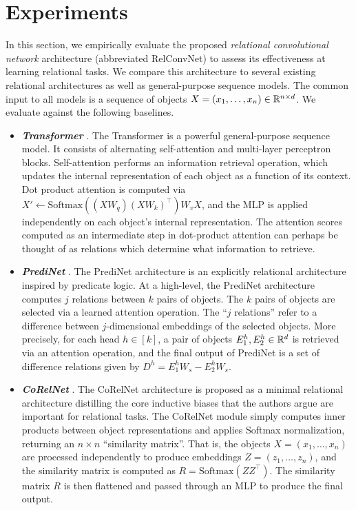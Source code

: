 \section{Experiments}\label{sec:experiments}

In this section, we empirically evaluate the proposed \textit{relational convolutional network} architecture (abbreviated RelConvNet) to assess its effectiveness at learning relational tasks. We compare this architecture to several existing relational architectures as well as general-purpose sequence models. The common input to all models is a sequence of objects $X = (x_1, \ldots, x_n) \in \mathbb{R}^{n \times d}$. We evaluate against the following baselines.
\begin{itemize}
    \item \textbf{\textit{Transformer}} \citep{vaswani2017attention}. The Transformer is a powerful general-purpose sequence model. It consists of alternating self-attention and multi-layer perceptron blocks. Self-attention performs an information retrieval operation, which updates the internal representation of each object as a function of its context.
    Dot product attention is computed via $X' \gets \mathrm{Softmax}((X W_q) (X W_k)^{\intercal}) W_v X$, and the MLP is applied independently on each object's internal representation.
    The attention scores computed as an intermediate step in dot-product attention can perhaps be thought of as relations which determine what information to retrieve.
    \item \textbf{\textit{PrediNet}} \citep{shanahanExplicitlyRelationalNeural}. The PrediNet architecture is an explicitly relational architecture inspired by predicate logic. At a high-level, the PrediNet architecture computes $j$ relations between $k$ pairs of objects. The $k$ pairs of objects are selected via a learned attention operation. The ``$j$ relations'' refer to a difference between $j$-dimensional embeddings of the selected objects. More precisely, for each head $h \in [k]$, a pair of objects $E_1^h, E_2^h \in \mathbb{R}^d$ is retrieved via an attention operation, and the final output of PrediNet is a set of difference relations given by $D^h = E_1^h W_s - E_2^h W_s$.
    \item \textbf{\textit{CoRelNet}} \citep{kergNeuralArchitecture2022}. The CoRelNet architecture is proposed as a minimal relational architecture distilling the core inductive biases that the authors argue are important for relational tasks. The CoRelNet module simply computes inner products between object representations and applies Softmax normalization, returning an $n \times n$ ``similarity matrix''. That is, the objects $X = (x_1, \ldots, x_n)$ are processed independently to produce embeddings $Z = (z_1, \ldots, z_n)$, and the similarity matrix is computed as $R = \mathrm{Softmax}(Z Z^\intercal)$. The similarity matrix $R$ is then flattened and passed through an MLP to produce the final output.

\end{itemize}
